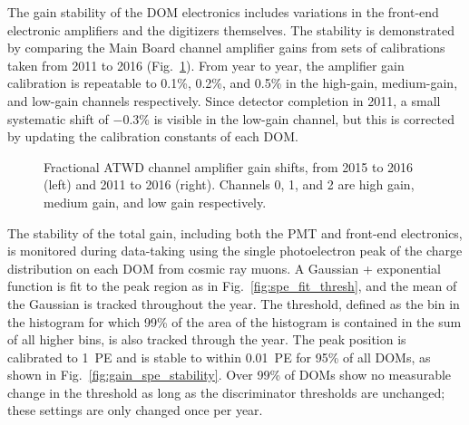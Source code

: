 The gain stability of the DOM electronics includes variations in the
front-end electronic amplifiers and the digitizers themselves.  The
stability is demonstrated by comparing the Main Board channel amplifier gains
from sets of calibrations taken from 2011 to 2016
(Fig.~\ref{fig:domcal_ch_gain}).  From year to year, the amplifier gain 
calibration is repeatable to 0.1\%, 0.2\%, and 0.5\% in the high-gain,
medium-gain, and low-gain channels respectively.  Since detector completion
in 2011, a small systematic shift of $-0.3\%$ is visible in the low-gain
channel, but this is corrected by updating the calibration constants of
each DOM.

\begin{figure}[!h]
  \captionsetup[subfigure]{labelformat=empty}
  \centering
  \caption{Fractional ATWD channel amplifier gain shifts, from 2015 to
    2016 (left) and 2011 to 2016 (right).  Channels 0, 1, and 2 are
    high gain, medium gain, and low gain respectively.}
  \label{fig:domcal_ch_gain}
\end{figure}

The stability of the total gain, including both the PMT and
front-end electronics, is monitored during data-taking using the
single photoelectron peak of the charge distribution on each DOM from
cosmic ray muons. A
Gaussian + exponential function is fit to the peak region as in
Fig.~\ref{fig:spe_fit_thresh}, and the mean of the Gaussian is
tracked throughout the year. The threshold, defined as the bin in the histogram for which 99\% of the area of the histogram is contained in the sum of all higher bins, is also tracked through
the year. The peak position is calibrated to 1~PE
and is stable to within 0.01~PE for 95\% of all DOMs, as shown in
Fig.~\ref{fig:gain_spe_stability}. Over 99\% of DOMs show no
measurable change in the threshold as long as the discriminator
thresholds are unchanged; these settings are only changed once per year.

